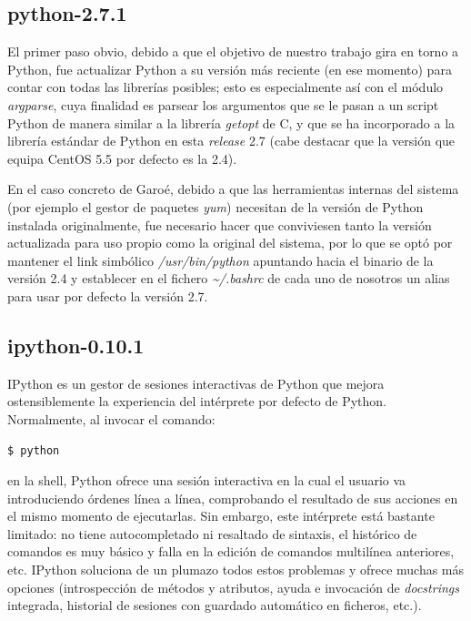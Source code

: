 \documentclass[twoside]{article}
\begin{document}
\subsection{python-2.7.1}
El primer paso obvio, debido a que el objetivo de nuestro trabajo gira en torno a Python, fue actualizar Python a su versión más reciente (en ese momento) para contar con todas las librerías posibles; esto es especialmente así con el módulo \emph{argparse}, cuya finalidad es parsear los argumentos que se le pasan a un script Python de manera similar a la librería \emph{getopt} de C, y que se ha incorporado a la librería estándar de Python en esta \emph{release} 2.7 (cabe destacar que la versión que equipa CentOS 5.5 por defecto es la 2.4).

\vspace{5 mm}

En el caso concreto de Garoé, debido a que las herramientas internas del sistema (por ejemplo el gestor de paquetes \emph{yum}) necesitan de la versión de Python instalada originalmente, fue necesario hacer que conviviesen tanto la versión actualizada para uso propio como la original del sistema, por lo que se optó por mantener el link simbólico \emph{/usr/bin/python} apuntando hacia el binario de la versión 2.4 y establecer en el fichero \emph{\textasciitilde/.bashrc} de cada uno de nosotros un alias para usar por defecto la versión 2.7.

\subsection{ipython-0.10.1}
IPython es un gestor de sesiones interactivas de Python que mejora ostensiblemente la experiencia del intérprete por defecto de Python. Normalmente, al invocar el comando:\begin{verbatim}$ python\end{verbatim} en la shell, Python ofrece una sesión interactiva en la cual el usuario va introduciendo órdenes línea a línea, comprobando el resultado de sus acciones en el mismo momento de ejecutarlas. Sin embargo, este intérprete está bastante limitado: no tiene autocompletado ni resaltado de sintaxis, el histórico de comandos es muy básico y falla en la edición de comandos multilínea anteriores, etc. IPython soluciona de un plumazo todos estos problemas y ofrece muchas más opciones (introspección de métodos y atributos, ayuda e invocación de \emph{docstrings} integrada, historial de sesiones con guardado automático en ficheros, etc.).
\end{document}

